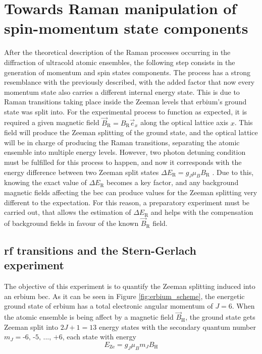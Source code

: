 
\chapter{Towards Raman manipulation of spin-momentum state components}
\label{chap:raman_manipulation}

After the theoretical description of the Raman processes occurring in the diffraction of ultracold atomic ensembles, the following step consists in the generation of momentum and spin states components. The process has a strong resemblance with the previously described, with the added factor that now every momentum state also carries a different internal energy state. This is due to Raman transitions taking place inside the Zeeman levels that erbium's ground state was split into. For the experimental process to function as expected, it is required a given magnetic field $\vec{B}_\text{R} = B_{\text{R}} \vec{e}_x$ along the optical lattice axis $x$. This field will produce the Zeeman splitting of the ground state, and the optical lattice will be in charge of producing the Raman transitions, separating the atomic ensemble into multiple energy levels. However, two photon detuning condition must be fulfilled for this process to happen, and now it corresponds with the energy difference between two Zeeman split states $\Delta E_\text{R} = g_J \mu_B B_\text{R}$ \cite{Foot2005}. Due to this, knowing the exact value of $\Delta E_\text{R}$ becomes a key factor, and any background magnetic fields  affecting the \ac{bec} can produce values for the Zeeman splitting very different to the expectation. For this reason, a preparatory experiment must be carried out, that allows the estimation of $\Delta E_\text{R}$ and helps with the compensation of background fields in favour of the known $\vec{B}_\text{R}$ field.

\section{\Acl{rf} transitions and the Stern-Gerlach experiment}

The objective of this experiment is to quantify the Zeeman splitting induced into an erbium \ac{bec}. As it can be seen in Figure \ref{fig:erbium_scheme}, the energetic ground state of erbium has a total electronic angular momentum of $J = 6$. When the atomic ensemble is being affect by a magnetic field $\vec{B}_\text{H}$, the ground state gets Zeeman split into $2J+1 = 13$ energy states with the secondary quantum number $m_J = \text{-6, -5, ..., +6}$, each state with energy \cite{Foot2005}
\begin{equation}
	E_\text{Ze} = g_J \mu_B m_J B_\text{H}
\end{equation}

